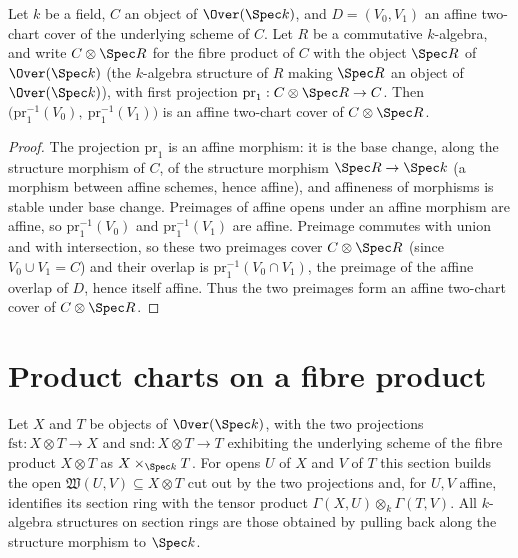 \begin{theorem}
  \label{thm:AffineTwoCover_pullbackProd}
  \leanok
  Let \(k\) be a field, \(C\) an object of \(\Over(\Spec k)\), and \(D = (V_0,V_1)\) an affine
  two-chart cover of the underlying scheme of \(C\). Let \(R\) be a commutative \(k\)-algebra,
  and write \(C \otimes \Spec R\) for the fibre product of \(C\) with the object \(\Spec R\) of
  \(\Over(\Spec k)\) (the \(k\)-algebra structure of \(R\) making \(\Spec R\) an object of
  \(\Over(\Spec k)\)), with first projection \(\mathrm{pr}_1 : C \otimes \Spec R \to C\). Then
  \(\bigl(\mathrm{pr}_1^{-1}(V_0),\ \mathrm{pr}_1^{-1}(V_1)\bigr)\) is an affine two-chart cover
  of \(C \otimes \Spec R\).
\end{theorem}
\begin{proof}
  \leanok
  The projection \(\mathrm{pr}_1\) is an affine morphism: it is the base change, along the
  structure morphism of \(C\), of the structure morphism \(\Spec R \to \Spec k\) (a morphism
  between affine schemes, hence affine), and affineness of morphisms is stable under base
  change. Preimages of affine opens under an affine morphism are affine, so
  \(\mathrm{pr}_1^{-1}(V_0)\) and \(\mathrm{pr}_1^{-1}(V_1)\) are affine. Preimage commutes with
  union and with intersection, so these two preimages cover \(C \otimes \Spec R\) (since
  \(V_0 \cup V_1 = C\)) and their overlap is \(\mathrm{pr}_1^{-1}(V_0 \cap V_1)\), the preimage
  of the affine overlap of \(D\), hence itself affine. Thus the two preimages form an affine
  two-chart cover of \(C \otimes \Spec R\).
\end{proof}

\section{Product charts on a fibre product}

Let \(X\) and \(T\) be objects of \(\Over(\Spec k)\), with the two projections
\(\mathrm{fst} \colon X \otimes T \to X\) and \(\mathrm{snd} \colon X \otimes T \to T\)
exhibiting the underlying scheme of the fibre product \(X \otimes T\) as
\(X \times_{\Spec k} T\). For opens \(U\) of \(X\) and \(V\) of \(T\) this section builds the
open \(\mathfrak W(U,V) \subseteq X \otimes T\) cut out by the two projections and, for \(U, V\)
affine, identifies its section ring with the tensor product \(\Gamma(X,U) \otimes_k \Gamma(T,V)\).
All \(k\)-algebra structures on section rings are those obtained by pulling back along the
structure morphism to \(\Spec k\).

